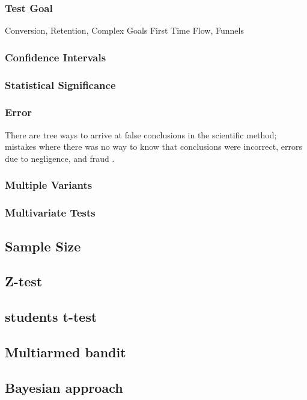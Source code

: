 \documentclass[english,12pt,a4paper,pdftex,elec,utf8]{aaltothesis}
\begin{document}
\subsubsection{Test Goal}
Conversion, Retention, Complex Goals
First Time Flow, Funnels

\subsubsection{Confidence Intervals}

\subsubsection{Statistical Significance}

\subsubsection{Error}
There are tree ways to arrive at false conclusions in the scientific method; mistakes where there was no way to know that conclusions were incorrect, errors due to negligence, and fraud \cite{Crawford1990}.
\subsubsection{Multiple Variants}

\subsubsection{Multivariate Tests}

\subsection{Sample Size}



\subsection{Z-test}
\subsection{students t-test}

\subsection{Multiarmed bandit}

\subsection{Bayesian approach}
\end{document}
